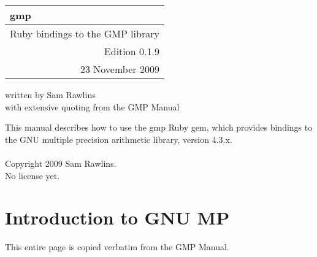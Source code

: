 \documentclass[pdftex,10pt]{article}
\newlength{\titrwidth}
\begin{document}
\begin{tabular}{p{1.0in} p{\titrwidth}}
\huge{gmp} &\\
\midrule[3pt]
\multicolumn{2}{r}{\large{Ruby bindings to the GMP library}}\\
\multicolumn{2}{r}{\large{Edition 0.1.9}}\\
\multicolumn{2}{r}{\large{23 November 2009}}
\end{tabular}

\vfill
\large{written by Sam Rawlins}\\
\large{with extensive quoting from the GMP Manual}
\newpage

\vfill
This manual describes how to use the gmp Ruby gem, which provides bindings to
the GNU multiple precision arithmetic library, version 4.3.x.\\
\\
Copyright 2009 Sam Rawlins.\\
No license yet.
\newpage

\tableofcontents
\newpage

\section{Introduction to GNU MP}

This entire page is copied verbatim from the GMP Manual.\\\\
\end{document}
